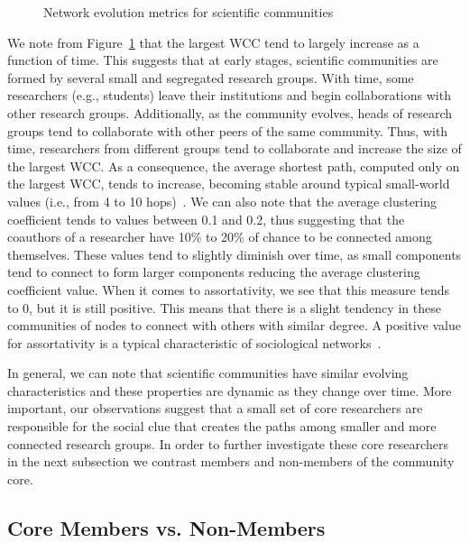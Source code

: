 \documentclass[letterpaper]{www13-companion-accepted}
\begin{document}
\begin{figure}[!htb]
\begin{center}
{  }%
  \end{center}
  \vspace{-0.5cm}
  \caption{Network evolution metrics for scientific communities}
  \vspace{-0.5cm}
  \label{fig:metrics}
\end{figure}


We note from Figure~\ref{fig:metrics} that the largest WCC tend to largely increase as a function of time. This suggests that at early
stages, scientific communities are formed by several small and segregated research groups. With time, some researchers (e.g., students) leave their institutions and begin collaborations
with other research groups. Additionally, as the community evolves, heads of  research groups tend to collaborate with other peers of the same community. Thus, with time, researchers
from different groups tend to collaborate and increase the size of the largest WCC. As a consequence, the average shortest path, computed only on the largest
WCC, tends to increase, becoming stable around typical small-world values (i.e., from 4 to 10 hops)~\cite{mislove-2007-socialnetworks,fourdegrees_facebook}.  We can
also note that the average clustering coefficient tends to values between 0.1 and 0.2, thus suggesting that the coauthors of a researcher have 10\% to 20\% of chance to be connected
among themselves. These values tend to slightly diminish over time, as small components tend to connect to form larger components reducing the average clustering coefficient
value.  When it comes to assortativity, we see that this measure tends to 0, but it is still positive. This means that there is a slight tendency in these communities of nodes to
connect with others with similar degree.  A positive value for assortativity is a typical characteristic of sociological networks~\cite{Newman2003}.

In general, we can note that scientific communities have similar evolving characteristics and these properties are dynamic as they change over time.  More important, our
observations suggest that a small set of core researchers are responsible for the social clue that creates the paths among smaller and more connected research groups. In order to 
further investigate these core researchers in the next subsection we contrast members and non-members of the community core. 

\subsection{Core Members vs. Non-Members}
\label{sub:vs}
\end{document}
